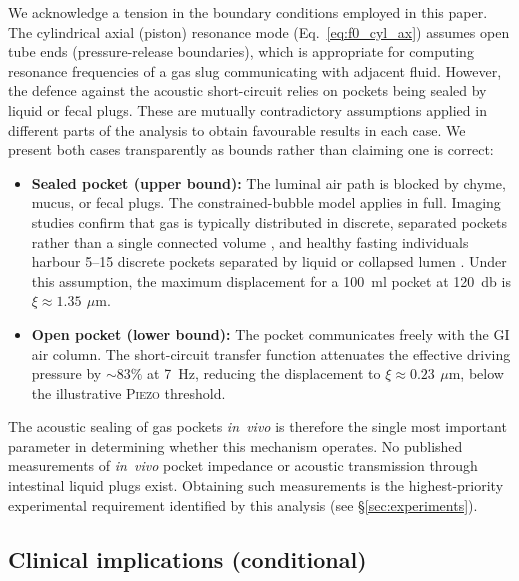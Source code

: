 \documentclass[12pt]{article}
\newcommand{\piezo}{\textsc{Piezo}}
\newcommand{\um}{\ensuremath{\,\mu\text{m}}}
\begin{document}
We acknowledge a tension in the boundary conditions employed in this paper.
The cylindrical axial (piston) resonance mode
(Eq.~\ref{eq:f0_cyl_ax}) assumes open tube ends (pressure-release
boundaries), which is appropriate for computing resonance frequencies of a
gas slug communicating with adjacent fluid.  However, the defence against
the acoustic short-circuit relies on pockets being sealed by liquid
or fecal plugs.  These are mutually contradictory assumptions applied in
different parts of the analysis to obtain favourable results in each case.
We present both cases transparently as bounds rather than claiming one
is correct:

\begin{itemize}
  \item \textbf{Sealed pocket (upper bound):} The luminal air path is
        blocked by chyme, mucus, or fecal plugs.  The constrained-bubble
        model applies in full.  Imaging studies confirm that gas is
        typically distributed in discrete, separated pockets rather than a
        single connected volume \citep{Levitt1971,Serra2001}, and healthy
        fasting individuals harbour 5--15 discrete pockets separated by
        liquid or collapsed lumen \citep{Suarez1997}.  Under this
        assumption, the maximum displacement for a \SI{100}{\milli\litre}
        pocket at \SI{120}{\decibel} is $\xi \approx \SI{1.35}{\um}$.

  \item \textbf{Open pocket (lower bound):} The pocket communicates
        freely with the GI air column.  The short-circuit transfer
        function attenuates the effective driving pressure by
        ${\sim}83\%$ at \SI{7}{\hertz}, reducing the displacement to
        $\xi \approx \SI{0.23}{\um}$, below the illustrative \piezo{}
        threshold.
\end{itemize}

The acoustic sealing of gas pockets \emph{in~vivo} is therefore the single
most important parameter in determining whether this mechanism operates.
No published measurements of \emph{in~vivo} pocket impedance or acoustic
transmission through intestinal liquid plugs exist.  Obtaining such
measurements is the highest-priority experimental requirement identified by
this analysis (see \S\ref{sec:experiments}).


\subsection{Clinical implications (conditional)}
\end{document}
